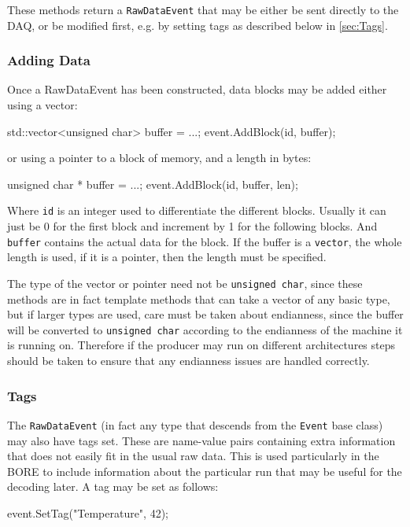 These methods return a \texttt{RawDataEvent} that may be either be sent directly to the DAQ,
or be modified first, e.g. by setting tags as described below in \autoref{sec:Tags}.

\subsubsection{Adding Data}
Once a RawDataEvent has been constructed,
data blocks may be added either using a vector:
\begin{listing}
std::vector<unsigned char> buffer = ...;
event.AddBlock(id, buffer);
\end{listing}

or using a pointer to a block of memory, and a length in bytes:
\begin{listing}
unsigned char * buffer = ...;
event.AddBlock(id, buffer, len);
\end{listing}

Where \texttt{id} is an integer used to differentiate the different blocks.
Usually it can just be 0 for the first block and increment by 1 for the following blocks.
And \texttt{buffer} contains the actual data for the block.
If the buffer is a \texttt{vector}, the whole length is used,
if it is a pointer, then the length must be specified.

The type of the vector or pointer need not be \texttt{unsigned char},
since these methods are in fact template methods that can take a vector of any basic type,
but if larger types are used, care must be taken about endianness,
since the buffer will be converted to \texttt{unsigned char}
according to the endianness of the machine it is running on.
Therefore if the producer may run on different architectures steps should be taken
to ensure that any endianness issues are handled correctly.

\subsubsection{Tags}\label{sec:Tags}
The \texttt{RawDataEvent} (in fact any type that descends from the \texttt{Event} base class)
may also have tags set.
These are name-value pairs containing extra information that does not easily fit
in the usual raw data.
This is used particularly in the \gls{BORE} to include information about the particular run
that may be useful for the decoding later.
A tag may be set as follows:
\begin{listing}
event.SetTag("Temperature", 42);
\end{listing}

